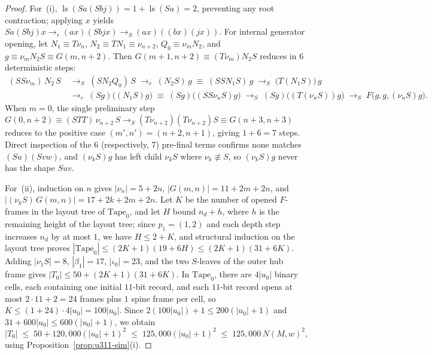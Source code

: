 \documentclass[11pt,reqno]{amsart}
\numberwithin{equation}{section}
\theoremstyle{plain}
\theoremstyle{definition}
\theoremstyle{remark}
\DeclareMathOperator{\ls}{ls}
\newcommand{\redS}{\to_S}
\begin{document}
\begin{proof}
For~(i), $\ls(S a (S b j)) = 1 + \ls(S a) = 2$, preventing any root contraction; applying $x$ yields $S a (S b j) x \to_r (a x)(S b j x) \redS (a x)((b x)(j x))$. For internal generator opening, let $N_1 \equiv T \nu_n$, $N_2 \equiv T N_1 \equiv \nu_{n+2}$, $Q_0 \equiv \nu_m N_2$, and $g \equiv \nu_m N_2 S \equiv G(m, n+2)$. Then $G(m+1, n+2) \equiv (T \nu_m) N_2 S$ reduces in $6$ deterministic steps:
\begin{align*}
  (S S \nu_m)\,N_2\,S &\;\redS\; (S N_2 Q_0)\,S \;\to_r\; (N_2 S)\,g \;\equiv\; (S S N_1 S)\,g \;\redS\; \bigl(T(N_1 S)\bigr)\,g \\
  &\;\to_r\; (S g)\bigl((N_1 S) g\bigr) \;\equiv\; (S g)\bigl((S S \nu_n S) g\bigr) \;\redS\; (S g)\bigl((T(\nu_n S)) g\bigr) \;\redS\; F\bigl(g, g, (\nu_n S) g\bigr).
\end{align*}
When $m = 0$, the single preliminary step $G(0, n+2) \equiv (S T T)\,\nu_{n+2}\,S \redS (T \nu_{n+2})(T \nu_{n+2}) S \equiv G(n+3, n+3)$ reduces to the positive case $(m', n') = (n+2, n+1)$, giving $1 + 6 = 7$ steps. Direct inspection of the $6$ (respectively, $7$) pre-final terms confirms none matches $(S u)(S v w)$, and $(\nu_k S) g$ has left child $\nu_k S$ where $\nu_k \not\equiv S$, so $(\nu_k S) g$ never has the shape $S u v$.

For~(ii), induction on $n$ gives $|\nu_n| = 5 + 2n$, $|G(m,n)| = 11 + 2m + 2n$, and $|(\nu_k S)\,G(m,n)| = 17 + 2k + 2m + 2n$. Let $K$ be the number of opened $F$-frames in the layout tree of $\mathrm{Tape}_0$, and let $H$ bound $n_d + h$, where $h$ is the remaining height of the layout tree; since $p_1 = (1,2)$ and each depth step increases $n_d$ by at most $1$, we have $H \le 2 + K$, and structural induction on the layout tree proves $|\mathrm{Tape}_0| \le (2K + 1)(19 + 6H) \le (2K + 1)(31 + 6K)$. Adding $|\nu_1 S| = 8$, $|\beta_1| = 17$, $|\iota_0| = 23$, and the two $S$-leaves of the outer hub frame gives $|T_0| \le 50 + (2K + 1)(31 + 6K)$. In $\mathrm{Tape}_0$, there are $4|u_0|$ binary cells, each containing one initial $11$-bit record, and each $11$-bit record opens at most $2 \cdot 11 + 2 = 24$ frames plus $1$ spine frame per cell, so $K \le (1 + 24) \cdot 4|u_0| = 100|u_0|$. Since $2(100|u_0|) + 1 \le 200(|u_0| + 1)$ and $31 + 600|u_0| \le 600(|u_0| + 1)$, we obtain
\[
  |T_0| \;\le\; 50 + 120{,}000(|u_0| + 1)^2 \;\le\; 125{,}000(|u_0| + 1)^2 \;\le\; 125{,}000\,N(M, w)^2,
\]
using Proposition~\ref{prop:u311-sim}(i).
\end{proof}
\end{document}
